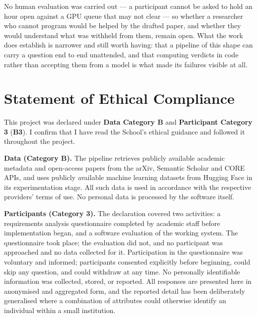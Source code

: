 No human evaluation was carried out --- a participant cannot be asked to hold an
hour open against a GPU queue that may not clear --- so whether a researcher who
cannot program would be helped by the drafted paper, and whether they would
understand what was withheld from them, remain open. What the work does establish
is narrower and still worth having: that a pipeline of this shape can carry a
question end to end unattended, and that computing verdicts in code rather than
accepting them from a model is what made its failures visible at all.

\chapter*{Statement of Ethical Compliance}

This project was declared under \textbf{Data Category B} and \textbf{Participant
Category 3} (\textbf{B3}). I confirm that I have read the School's ethical guidance and
followed it throughout the project.

\textbf{Data (Category B).} The pipeline retrieves publicly available academic metadata and
open-access papers from the arXiv, Semantic Scholar and CORE APIs, and uses publicly
available machine learning datasets from Hugging Face in its experimentation stage. All such
data is used in accordance with the respective providers' terms of use. No personal data is
processed by the software itself.

\textbf{Participants (Category 3).} The declaration covered two activities: a requirements
analysis questionnaire completed by academic staff before implementation began, and a
software evaluation of the working system. The questionnaire took place; the evaluation did
not, and no participant was approached and no data collected for it. Participation in the
questionnaire was voluntary and informed; participants consented explicitly before beginning,
could skip any question, and could withdraw at any time. No personally identifiable information was collected,
stored, or reported. All responses are presented here in anonymised and aggregated form, and
the reported detail has been deliberately generalised where a combination of attributes could
otherwise identify an individual within a small institution.

\tableofcontents
